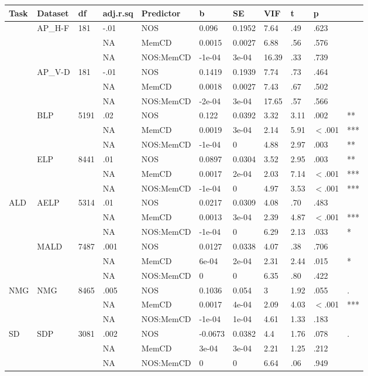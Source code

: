 \begin{table}[ht]
\centering
\begingroup\normalsize
\begin{tabular}{lllllllllll}
  \hline
Task & Dataset & df & adj.r.sq & Predictor & b & SE & VIF & t & p &  \\ 
  \hline
 & AP\_H-F & 181 & -.01 & NOS & 0.096 & 0.1952 & 7.64 & .49 & .623 &   \\ 
   &  &  & NA & MemCD & 0.0015 & 0.0027 & 6.88 & .56 & .576 &   \\ 
   &  &  & NA & NOS:MemCD & -1e-04 & 3e-04 & 16.39 & .33 & .739 &   \\ 
   & AP\_V-D & 181 & -.01 & NOS & 0.1419 & 0.1939 & 7.74 & .73 & .464 &   \\ 
   &  &  & NA & MemCD & 0.0018 & 0.0027 & 7.43 & .67 & .502 &   \\ 
   &  &  & NA & NOS:MemCD & -2e-04 & 3e-04 & 17.65 & .57 & .566 &   \\ 
   & BLP & 5191 & .02 & NOS & 0.122 & 0.0392 & 3.32 & 3.11 & .002 & ** \\ 
   &  &  & NA & MemCD & 0.0019 & 3e-04 & 2.14 & 5.91 & $<$.001 & *** \\ 
   &  &  & NA & NOS:MemCD & -1e-04 & 0 & 4.88 & 2.97 & .003 & ** \\ 
   & ELP & 8441 & .01 & NOS & 0.0897 & 0.0304 & 3.52 & 2.95 & .003 & ** \\ 
   &  &  & NA & MemCD & 0.0017 & 2e-04 & 2.03 & 7.14 & $<$.001 & *** \\ 
   &  &  & NA & NOS:MemCD & -1e-04 & 0 & 4.97 & 3.53 & $<$.001 & *** \\ 
  ALD & AELP & 5314 & .01 & NOS & 0.0217 & 0.0309 & 4.08 & .70 & .483 &   \\ 
   &  &  & NA & MemCD & 0.0013 & 3e-04 & 2.39 & 4.87 & $<$.001 & *** \\ 
   &  &  & NA & NOS:MemCD & -1e-04 & 0 & 6.29 & 2.13 & .033 & * \\ 
   & MALD & 7487 & .001 & NOS & 0.0127 & 0.0338 & 4.07 & .38 & .706 &   \\ 
   &  &  & NA & MemCD & 6e-04 & 2e-04 & 2.31 & 2.44 & .015 & * \\ 
   &  &  & NA & NOS:MemCD & 0 & 0 & 6.35 & .80 & .422 &   \\ 
  NMG & NMG & 8465 & .005 & NOS & 0.1036 & 0.054 & 3 & 1.92 & .055 & . \\ 
   &  &  & NA & MemCD & 0.0017 & 4e-04 & 2.09 & 4.03 & $<$.001 & *** \\ 
   &  &  & NA & NOS:MemCD & -1e-04 & 1e-04 & 4.61 & 1.33 & .183 &   \\ 
  SD & SDP & 3081 & .002 & NOS & -0.0673 & 0.0382 & 4.4 & 1.76 & .078 & . \\ 
   &  &  & NA & MemCD & 3e-04 & 3e-04 & 2.21 & 1.25 & .212 &   \\ 
   &  &  & NA & NOS:MemCD & 0 & 0 & 6.64 & .06 & .949 &   \\ 
   \hline
\end{tabular}
\endgroup
\end{table}

